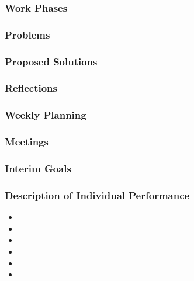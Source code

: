 \subsubsection{Work Phases}

\subsubsection{Problems}

\subsubsection{Proposed Solutions}

\subsubsection{Reflections}

\subsubsection{Weekly Planning}

\subsubsection{Meetings}

\subsubsection{Interim Goals}

\subsubsection{Description of Individual Performance}
    \begin{itemize}
      \item \performance{\martin}{}
      
      \item \performance{\felix}{}
      
      \item \performance{\hannes}{}
      
      \item \performance{\arvid}{}
      
      \item \performance{\marcus}{}
      
      \item \performance{\jakob}{}
    \end{itemize}
